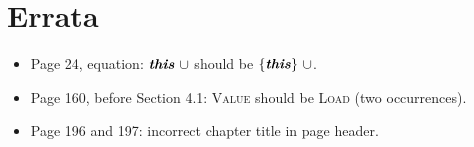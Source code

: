 \documentclass[letterpaper,12pt]{article}
\begin{document}
\thispagestyle{empty}
\section*{Errata}
\begin{itemize}
  \item Page 24, equation: $\textbf{\emph{this}}~\cup$ should be $\{ \textbf{\emph{this}} \}~\cup$.
  \item Page 160, before Section 4.1: \textsc{Value} should be \textsc{Load} (two occurrences).
  \item Page 196 and 197: incorrect chapter title in page header.
\end{itemize}
\end{document}
